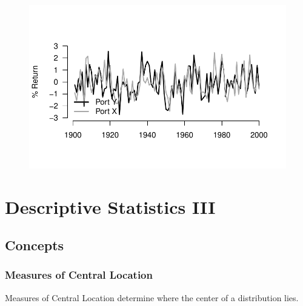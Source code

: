 \documentclass[
  letterpaper,
  DIV=11,
  numbers=noendperiod]{scrreprt}
\begin{document}
\begin{figure}[H]

{\centering \includegraphics{./03-DescriptiveII_files/figure-pdf/unnamed-chunk-14-1.pdf}

}

\end{figure}

\hypertarget{descriptive-statistics-iii}{%
\chapter{Descriptive Statistics III}\label{descriptive-statistics-iii}}

\hypertarget{concepts-2}{%
\section{Concepts}\label{concepts-2}}

\hypertarget{measures-of-central-location}{%
\subsection*{Measures of Central
Location}\label{measures-of-central-location}}

Measures of Central Location determine where the center of a
distribution lies.
\end{document}
